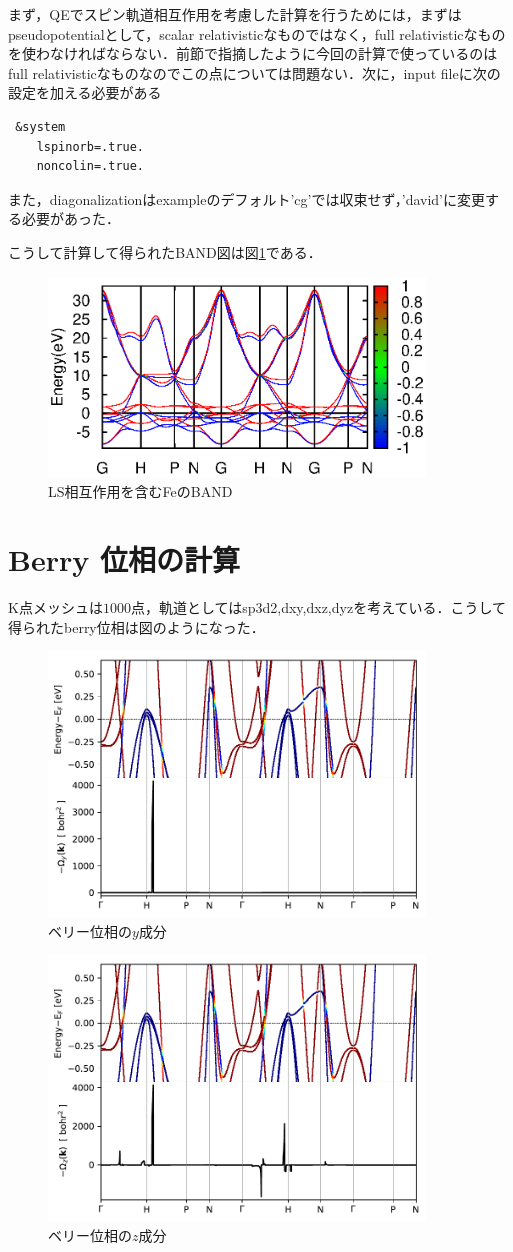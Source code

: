 \documentclass[a4j]{jarticle}
\begin{document}
まず，QEでスピン軌道相互作用を考慮した計算を行うためには，まずはpseudopotentialとして，scalar relativisticなものではなく，full relativisticなものを使わなければならない．前節で指摘したように今回の計算で使っているのはfull relativisticなものなのでこの点については問題ない．次に，input fileに次の設定を加える必要がある
\begin{lstlisting}
 &system
    lspinorb=.true.
    noncolin=.true.
\end{lstlisting}
また，diagonalizationはexampleのデフォルト'cg'では収束せず，'david'に変更する必要があった．

こうして計算して得られたBAND図は図\ref{122604_4Jul19}である．
\begin{figure}[htb]
\centering
 \includegraphics[width=10cm]{bandLS.eps}
\caption{LS相互作用を含むFeのBAND}
\label{122604_4Jul19}
\end{figure}




\section{Berry 位相の計算}
K点メッシュは$1000$点，軌道としてはsp3d2,dxy,dxz,dyzを考えている．こうして得られたberry位相は図のようになった．
\begin{figure}[htb]
 \centering
\includegraphics[width=10cm]{Fe-bands+curv_y.pdf}
\caption{ベリー位相の$y$成分}
\end{figure}

\begin{figure}[htb]
 \centering
\includegraphics[width=10cm]{Fe-bands+curv_z.pdf}
\caption{ベリー位相の$z$成分}
\end{figure}
\end{document}
